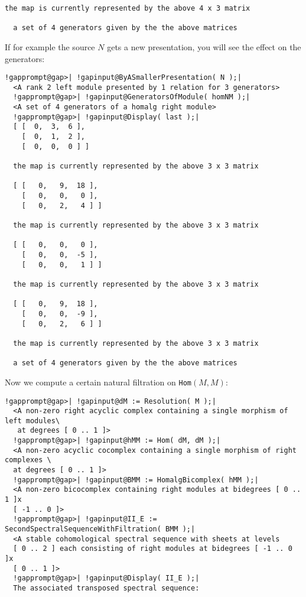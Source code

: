 \documentclass[a4paper,11pt]{report}
\begin{document}
{{{\begin{Verbatim}[commandchars=!@|,fontsize=\small,frame=single,label=Example]
  the map is currently represented by the above 4 x 3 matrix
  
  a set of 4 generators given by the the above matrices
\end{Verbatim}
 If for example the source $N$ gets a new presentation, you will see the effect on the generators: 
\begin{Verbatim}[commandchars=!@|,fontsize=\small,frame=single,label=Example]
  !gapprompt@gap>| !gapinput@ByASmallerPresentation( N );|
  <A rank 2 left module presented by 1 relation for 3 generators>
  !gapprompt@gap>| !gapinput@GeneratorsOfModule( homNM );|
  <A set of 4 generators of a homalg right module>
  !gapprompt@gap>| !gapinput@Display( last );|
  [ [  0,  3,  6 ],
    [  0,  1,  2 ],
    [  0,  0,  0 ] ]
  
  the map is currently represented by the above 3 x 3 matrix
  
  [ [   0,   9,  18 ],
    [   0,   0,   0 ],
    [   0,   2,   4 ] ]
  
  the map is currently represented by the above 3 x 3 matrix
  
  [ [   0,   0,   0 ],
    [   0,   0,  -5 ],
    [   0,   0,   1 ] ]
  
  the map is currently represented by the above 3 x 3 matrix
  
  [ [   0,   9,  18 ],
    [   0,   0,  -9 ],
    [   0,   2,   6 ] ]
  
  the map is currently represented by the above 3 x 3 matrix
  
  a set of 4 generators given by the the above matrices
\end{Verbatim}
 Now we compute a certain natural filtration on \texttt{Hom}$(M,M)$: 
\begin{Verbatim}[commandchars=!@|,fontsize=\small,frame=single,label=Example]
  !gapprompt@gap>| !gapinput@dM := Resolution( M );|
  <A non-zero right acyclic complex containing a single morphism of left modules\
   at degrees [ 0 .. 1 ]>
  !gapprompt@gap>| !gapinput@hMM := Hom( dM, dM );|
  <A non-zero acyclic cocomplex containing a single morphism of right complexes \
  at degrees [ 0 .. 1 ]>
  !gapprompt@gap>| !gapinput@BMM := HomalgBicomplex( hMM );|
  <A non-zero bicocomplex containing right modules at bidegrees [ 0 .. 1 ]x
  [ -1 .. 0 ]>
  !gapprompt@gap>| !gapinput@II_E := SecondSpectralSequenceWithFiltration( BMM );|
  <A stable cohomological spectral sequence with sheets at levels 
  [ 0 .. 2 ] each consisting of right modules at bidegrees [ -1 .. 0 ]x
  [ 0 .. 1 ]>
  !gapprompt@gap>| !gapinput@Display( II_E );|
  The associated transposed spectral sequence:
  

\end{Verbatim}}}}
\end{document}

